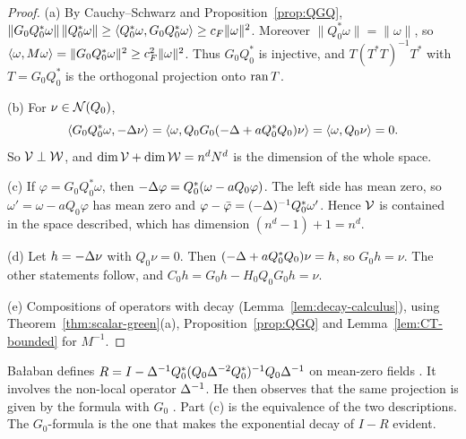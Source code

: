\begin{proof}
(a) By Cauchy--Schwarz and Proposition~\ref{prop:QGQ}, $\|G_0Q_0^*\omega\|\,\|Q_0^*\omega\|\ge\langle Q_0^*\omega,G_0Q_0^*\omega\rangle\ge c_F\|\omega\|^2$. Moreover $\|Q_0^*\omega\|=\|\omega\|$, so $\langle \omega,M\omega\rangle=\|G_0Q_0^*\omega\|^2\ge c_F^2\|\omega\|^2$. Thus $G_0Q_0^*$ is injective, and $T(T^*T)^{-1}T^*$ with $T=G_0Q_0^*$ is the orthogonal projection onto $\operatorname{ran} T$.

(b) For $\nu\in\mathcal N(Q_0)$,
\[
\langle G_0Q_0^*\omega,-\Delta\nu\rangle=\langle \omega,Q_0G_0(-\Delta+aQ_0^*Q_0)\nu\rangle=\langle \omega,Q_0\nu\rangle=0 .
\]
So $\mathcal V\perp\mathcal W$, and $\dim\mathcal V+\dim\mathcal W=n^dN^d$ is the dimension of the whole space.

(c) If $\varphi=G_0Q_0^*\omega$, then $-\Delta\varphi=Q_0^*(\omega-aQ_0\varphi)$. The left side has mean zero, so $\omega'=\omega-aQ_0\varphi$ has mean zero and $\varphi-\bar\varphi=(-\Delta)^{-1}Q_0^*\omega'$. Hence $\mathcal V$ is contained in the space described, which has dimension $(n^d-1)+1=n^d$.

(d) Let $h=-\Delta\nu$ with $Q_0\nu=0$. Then $(-\Delta+aQ_0^*Q_0)\nu=h$, so $G_0h=\nu$. The other statements follow, and $C_0h=G_0h-H_0Q_0G_0h=\nu$.

(e) Compositions of operators with decay (Lemma~\ref{lem:decay-calculus}), using Theorem~\ref{thm:scalar-green}(a), Proposition~\ref{prop:QGQ} and Lemma~\ref{lem:CT-bounded} for $M^{-1}$.
\end{proof}

\begin{remark}\label{x:8.9}
Ba\l aban defines $R=I-\Delta^{-1}Q_0^*(Q_0\Delta^{-2}Q_0^*)^{-1}Q_0\Delta^{-1}$ on mean-zero fields \cite[(1.38)]{BalPropI}. It involves the non-local operator $\Delta^{-1}$. He then observes that the same projection is given by the formula with $G_0$ \cite[(1.44)]{BalPropI}. Part (c) is the equivalence of the two descriptions. The $G_0$-formula is the one that makes the exponential decay of $I-R$ evident.
\end{remark}
